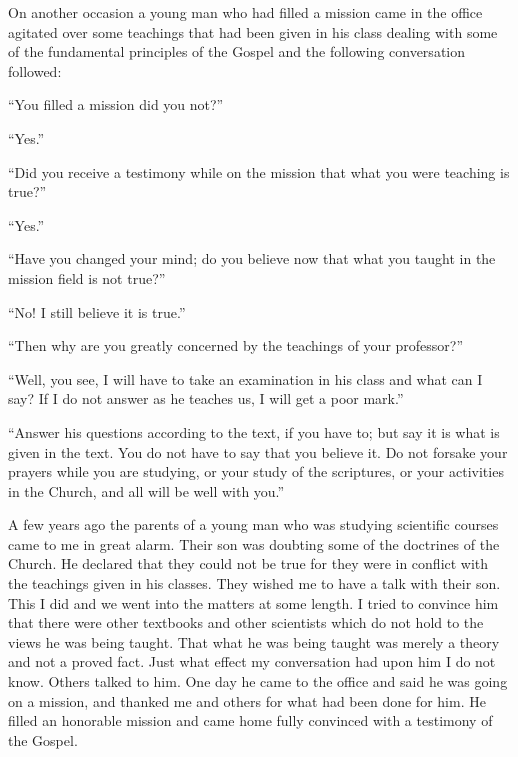 On another occasion a young man who had filled a mission came in the office agitated over
some teachings that had been given in his class dealing with some of the fundamental
principles of the Gospel and the following conversation followed:

``You filled a mission did you not?''

``Yes.''

``Did you receive a testimony while on the mission that what you were teaching is true?''

``Yes.''

``Have you changed your mind; do you believe now that what you taught in the mission field
is not true?''

``No! I still believe it is true.''

``Then why are you greatly concerned by the teachings of your professor?''

``Well, you see, I will have to take an examination in his class and what can I say? If I do not
answer as he teaches us, I will get a poor mark.''

``Answer his questions according to the text, if you have to; but say it is what is given in the
text. You do not have to say that you believe it. Do not forsake your prayers while you are
studying, or your study of the scriptures, or your activities in the Church, and all will be well
with you.''

A few years ago the parents of a young man who was studying scientific courses came to me
in great alarm. Their son was doubting some of the doctrines of the Church. He declared that
they could not be true for they were in conflict with the teachings given in his classes. They
wished me to have a talk with their son. This I did and we went into the matters at some
length. I tried to convince him that there were other textbooks and other scientists which do
not hold to the views he was being taught. That what he was being taught was merely a
theory and not a proved fact. Just what effect my conversation had upon him I do not know.
Others talked to him. One day he came to the office and said he was going on a mission, and
thanked me and others for what had been done for him. He filled an honorable mission and
came home fully convinced with a testimony of the Gospel.

